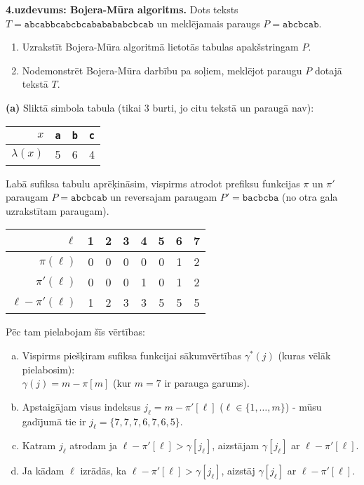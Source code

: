 \documentclass[11pt]{article}
\begin{document}
{\footnotesize
\vspace{10ex}
{\bf 4.uzdevums: Bojera-Mūra algoritms.}
Dots teksts $T = \mathtt{abcabbcabcbcababababcbcab}$ un meklējamais paraugs
$P = \mathtt{abcbcab}$.
\begin{enumerate}[label=(\alph*)]
\item Uzrakstīt Bojera-Mūra algoritmā lietotās tabulas apakšstringam $P$.
\item Nodemonstrēt Bojera-Mūra darbību pa soļiem, meklējot paraugu $P$ dotajā tekstā $T$.
\end{enumerate}
}

\vspace{2ex}
{\bf (a)} Sliktā simbola tabula (tikai $3$ burti, jo citu tekstā un paraugā nav):

\begin{tabular}{|r||c|c|c|} \hline
$x$ & {\tt a} & {\tt b} & {\tt c} \\ \hline
$\lambda(x)$ & 5 & 6 & 4 \\ \hline
\end{tabular}

Labā sufiksa tabulu aprēķināsim, vispirms atrodot prefiksu funkcijas $\pi$ 
un $\pi'$ paraugam $P = \mathtt{abcbcab}$ un reversajam paraugam 
$P' = \mathtt{bacbcba}$ (no otra gala uzrakstītam paraugam). 

\begin{tabular}{|r||c|c|c|c|c|c|c|} \hline
$\ell$              & 1 & 2 & 3 & 4 & 5 & 6 & 7 \\ \hline
$\pi(\ell)$         & 0 & 0 & 0 & 0 & 0 & 1 & 2 \\ \hline
$\pi'(\ell)$        & 0 & 0 & 0 & 1 & 0 & 1 & 2 \\ \hline
$\ell - \pi'(\ell)$ & 1 & 2 & 3 & 3 & 5 & 5 & 5 \\ \hline
\end{tabular}


Pēc tam pielabojam šīs vērtības: 

\begin{enumerate}[(a)]
\item Vispirms piešķiram sufiksa funkcijai sākumvērtības $\gamma^{\ast}(j)$ (kuras vēlāk pielabosim):\\
$\gamma(j) = m - \pi[m]$ (kur $m = 7$ ir parauga garums). 
\item Apstaigājam visus indeksus 
$j_{\ell}=m-\pi'[\ell]$ ($\ell \in \{ 1,\ldots,m \}$) - 
mūsu gadījumā tie ir $j_{\ell}= \{ 7,7,7,6,7,6,5 \}$.
\item Katram $j_{\ell}$ atrodam ja $\ell - \pi'[\ell] > \gamma[j_\ell]$, 
aizstājam $\gamma[j_\ell]$ ar $\ell - \pi'[\ell]$. 
\item Ja kādam $\ell$ izrādās, ka $\ell - \pi'[\ell] > \gamma[j_\ell]$, 
aizstāj $\gamma[j_\ell]$ ar $\ell - \pi'[\ell]$. 
\end{enumerate} 
\end{document}
